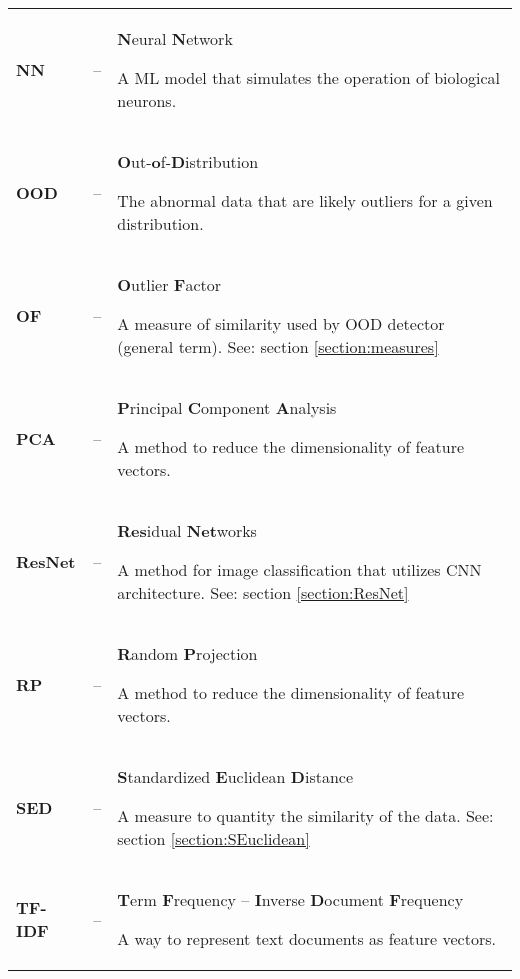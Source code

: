 {\begin{longtable}{>{\bfseries}l l p{}}
        NN
        &–&
        \textbf{N}eural \textbf{N}etwork
        \par
        \small
        A ML model that simulates the operation of biological neurons.
        \\

        OOD
        &–&
        \textbf{O}ut-\textbf{o}f-\textbf{D}istribution
        \par
        \small
        The abnormal data that are likely outliers for a given distribution.
        \\

        OF
        &–&
        \textbf{O}utlier \textbf{F}actor
        \par
        \small
        A measure of similarity used by OOD detector (general term).
        \newline
        See: section \ref{section:measures}
        \\

        PCA
        &–&
        \textbf{P}rincipal \textbf{C}omponent \textbf{A}nalysis
        \par
        \small
        A method to reduce the dimensionality of feature vectors.
        \\

        ResNet
        &–&
        \textbf{Res}idual \textbf{Net}works
        \par
        \small
        A method for image classification that utilizes CNN architecture.
        \newline
        See: section \ref{section:ResNet}
        \\

        RP
        &–&
        \textbf{R}andom \textbf{P}rojection
        \par
        \small
        A method to reduce the dimensionality of feature vectors.
        \\

        SED
        &–&
        \textbf{S}tandardized \textbf{E}uclidean \textbf{D}istance
        \par
        \small
        A measure to quantity the similarity of the data.
        \newline
        See: section \ref{section:SEuclidean}
        \\

        TF-IDF
        &–&
        \textbf{T}erm \textbf{F}requency – \textbf{I}nverse \textbf{D}ocument \textbf{F}requency
        \par
        \small
        A way to represent text documents as feature vectors.
        \\


\end{longtable}}
